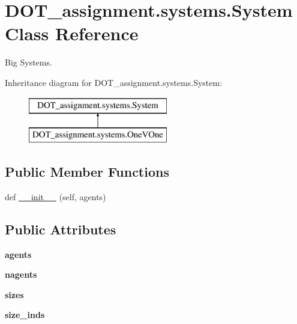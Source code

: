 \hypertarget{class_d_o_t__assignment_1_1systems_1_1_system}{}\section{D\+O\+T\+\_\+assignment.\+systems.\+System Class Reference}
\label{class_d_o_t__assignment_1_1systems_1_1_system}


Big Systems.  


Inheritance diagram for D\+O\+T\+\_\+assignment.\+systems.\+System\+:\begin{figure}[H]
\begin{center}
\leavevmode
\includegraphics[height=2.000000cm]{class_d_o_t__assignment_1_1systems_1_1_system}
\end{center}
\end{figure}
\subsection*{Public Member Functions}
\begin{DoxyCompactItemize}
\item 
def \mbox{\hyperlink{class_d_o_t__assignment_1_1systems_1_1_system_a7a3d17f1f8331c684a408ddbc6c44ed2}{\+\_\+\+\_\+init\+\_\+\+\_\+}} (self, agents)
\end{DoxyCompactItemize}
\subsection*{Public Attributes}
\begin{DoxyCompactItemize}
\item 
\mbox{\label{class_d_o_t__assignment_1_1systems_1_1_system_aeaf4f2592240e25b4ce97b643db6acae}} 
{\bfseries agents}
\item 
\mbox{\label{class_d_o_t__assignment_1_1systems_1_1_system_a75ea2392922616c9626db532d4d4ac21}} 
{\bfseries nagents}
\item 
\mbox{\label{class_d_o_t__assignment_1_1systems_1_1_system_a5318381db43c20a7d325ffce257543fe}} 
{\bfseries sizes}
\item 
\mbox{\label{class_d_o_t__assignment_1_1systems_1_1_system_a7488bee71f0759f7425f87196faaa16d}} 
{\bfseries size\+\_\+inds}
\end{DoxyCompactItemize}


